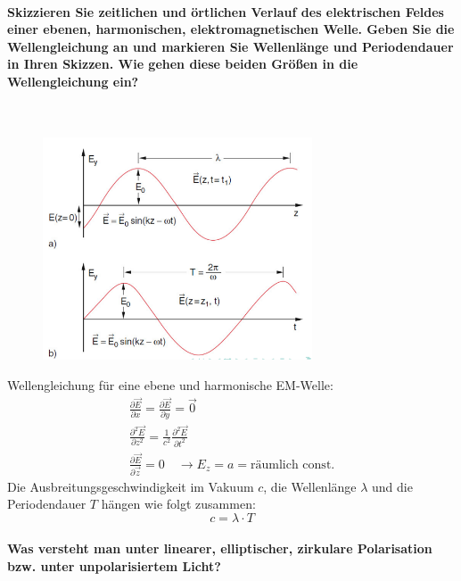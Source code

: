 \documentclass[a4paper, 11pt, ngerman, parskip=half-]{scrartcl}
\begin{document}
\paragraph{Skizzieren Sie zeitlichen und örtlichen Verlauf des elektrischen Feldes einer ebenen,
harmonischen, elektromagnetischen Welle. Geben Sie die Wellengleichung an und markieren Sie
Wellenlänge und Periodendauer in Ihren Skizzen. Wie gehen diese beiden Größen in die Wellengleichung
ein?} ~

\begin{figure}[H]
    \centering
    \includegraphics[width=8cm]{image/13/2.png}
\end{figure}
Wellengleichung für eine ebene und harmonische EM-Welle:
\begin{equation}
    \begin{split}
        \frac{\partial \vec{E}}{\partial x} = \frac{\partial \vec{E}}{\partial y} = \vec{0} \\
        \frac{\partial^2 \vec{E}}{\partial z^2} = \frac{1}{c^2} \frac{\partial^2 \vec{E}}{\partial t^2} \\
        \frac{\partial \vec{E}}{\partial \vec{z}} = 0 \quad \rightarrow E_z = a = \text{räumlich const.}
    \end{split}  
\end{equation}
Die Ausbreitungsgeschwindigkeit im Vakuum $c$, die Wellenlänge $\lambda$ und die Periodendauer $T$ hängen wie folgt zusammen:
\begin{equation}
    c = \lambda \cdot T
\end{equation}
\paragraph{Was versteht man unter linearer, elliptischer, zirkulare Polarisation bzw. unter
unpolarisiertem Licht?} ~
\end{document}
